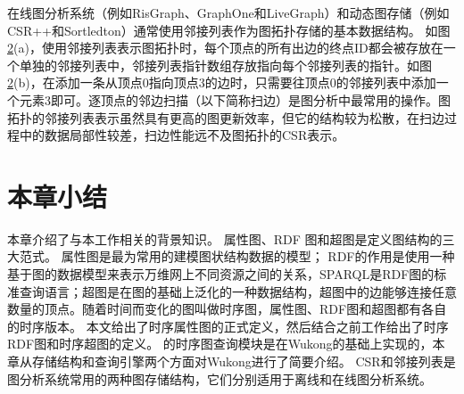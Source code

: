 \begin{figure}[!htb]
\label{csr}
\end{figure}

在线图分析系统（例如RisGraph\cite{risgraph}、GraphOne\cite{graphone}和LiveGraph）和动态图存储（例如CSR++\cite{csrpp}和Sortledton\cite{sortledton}）通常使用邻接列表作为图拓扑存储的基本数据结构。
如图\ref{adja}(a)，使用邻接列表表示图拓扑时，每个顶点的所有出边的终点ID都会被存放在一个单独的邻接列表中，邻接列表指针数组存放指向每个邻接列表的指针。如图\ref{adja}(b)，在添加一条从顶点0指向顶点3的边时，只需要往顶点0的邻接列表中添加一个元素3即可。逐顶点的邻边扫描（以下简称扫边）是图分析中最常用的操作。图拓扑的邻接列表表示虽然具有更高的图更新效率，但它的结构较为松散，在扫边过程中的数据局部性较差，扫边性能远不及图拓扑的CSR表示。
\begin{figure}[!htb]
\label{adja}
\end{figure}

\section{本章小结}
本章介绍了与本工作相关的背景知识。
属性图、RDF 图和超图是定义图结构的三大范式。
属性图是最为常用的建模图状结构数据的模型；
RDF的作用是使用一种基于图的数据模型来表示万维网上不同资源之间的关系，SPARQL是RDF图的标准查询语言；超图是在图的基础上泛化的一种数据结构，超图中的边能够连接任意数量的顶点。随着时间而变化的图叫做时序图，属性图、RDF图和超图都有各自的时序版本。
本文给出了时序属性图的正式定义，然后结合之前工作给出了时序RDF图和时序超图的定义。
\sys 的时序图查询模块是在Wukong的基础上实现的，本章从存储结构和查询引擎两个方面对Wukong进行了简要介绍。
CSR和邻接列表是图分析系统常用的两种图存储结构，它们分别适用于离线和在线图分析系统。